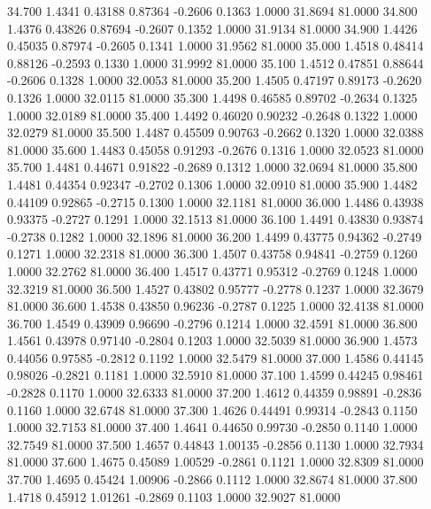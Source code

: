  34.700   1.4341   0.43188   0.87364  -0.2606   0.1363   1.0000  31.8694  81.0000
  34.800   1.4376   0.43826   0.87694  -0.2607   0.1352   1.0000  31.9134  81.0000
  34.900   1.4426   0.45035   0.87974  -0.2605   0.1341   1.0000  31.9562  81.0000
  35.000   1.4518   0.48414   0.88126  -0.2593   0.1330   1.0000  31.9992  81.0000
  35.100   1.4512   0.47851   0.88644  -0.2606   0.1328   1.0000  32.0053  81.0000
  35.200   1.4505   0.47197   0.89173  -0.2620   0.1326   1.0000  32.0115  81.0000
  35.300   1.4498   0.46585   0.89702  -0.2634   0.1325   1.0000  32.0189  81.0000
  35.400   1.4492   0.46020   0.90232  -0.2648   0.1322   1.0000  32.0279  81.0000
  35.500   1.4487   0.45509   0.90763  -0.2662   0.1320   1.0000  32.0388  81.0000
  35.600   1.4483   0.45058   0.91293  -0.2676   0.1316   1.0000  32.0523  81.0000
  35.700   1.4481   0.44671   0.91822  -0.2689   0.1312   1.0000  32.0694  81.0000
  35.800   1.4481   0.44354   0.92347  -0.2702   0.1306   1.0000  32.0910  81.0000
  35.900   1.4482   0.44109   0.92865  -0.2715   0.1300   1.0000  32.1181  81.0000
  36.000   1.4486   0.43938   0.93375  -0.2727   0.1291   1.0000  32.1513  81.0000
  36.100   1.4491   0.43830   0.93874  -0.2738   0.1282   1.0000  32.1896  81.0000
  36.200   1.4499   0.43775   0.94362  -0.2749   0.1271   1.0000  32.2318  81.0000
  36.300   1.4507   0.43758   0.94841  -0.2759   0.1260   1.0000  32.2762  81.0000
  36.400   1.4517   0.43771   0.95312  -0.2769   0.1248   1.0000  32.3219  81.0000
  36.500   1.4527   0.43802   0.95777  -0.2778   0.1237   1.0000  32.3679  81.0000
  36.600   1.4538   0.43850   0.96236  -0.2787   0.1225   1.0000  32.4138  81.0000
  36.700   1.4549   0.43909   0.96690  -0.2796   0.1214   1.0000  32.4591  81.0000
  36.800   1.4561   0.43978   0.97140  -0.2804   0.1203   1.0000  32.5039  81.0000
  36.900   1.4573   0.44056   0.97585  -0.2812   0.1192   1.0000  32.5479  81.0000
  37.000   1.4586   0.44145   0.98026  -0.2821   0.1181   1.0000  32.5910  81.0000
  37.100   1.4599   0.44245   0.98461  -0.2828   0.1170   1.0000  32.6333  81.0000
  37.200   1.4612   0.44359   0.98891  -0.2836   0.1160   1.0000  32.6748  81.0000
  37.300   1.4626   0.44491   0.99314  -0.2843   0.1150   1.0000  32.7153  81.0000
  37.400   1.4641   0.44650   0.99730  -0.2850   0.1140   1.0000  32.7549  81.0000
  37.500   1.4657   0.44843   1.00135  -0.2856   0.1130   1.0000  32.7934  81.0000
  37.600   1.4675   0.45089   1.00529  -0.2861   0.1121   1.0000  32.8309  81.0000
  37.700   1.4695   0.45424   1.00906  -0.2866   0.1112   1.0000  32.8674  81.0000
  37.800   1.4718   0.45912   1.01261  -0.2869   0.1103   1.0000  32.9027  81.0000
